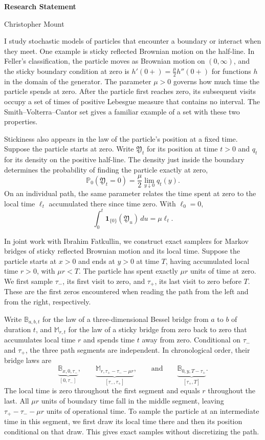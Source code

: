\documentclass[12pt,letterpaper]{article}
\begin{document}
\begin{center}
  {\Large\bfseries Research Statement}\par
  Christopher Mount
\end{center}

I study stochastic models of particles that encounter a boundary or interact when they meet.
One example is sticky reflected Brownian motion on the half-line. In Feller's classification,
the particle moves as Brownian motion on \((0,\infty)\), and the sticky boundary condition
at zero is \(h'(0+)=\tfrac{\mu}{2}h''(0+)\) for functions \(h\) in the domain of the generator.
The parameter \(\mu>0\) governs how much time the particle spends at zero. After the particle
first reaches zero, its subsequent visits occupy a set of times of positive Lebesgue measure
that contains no interval. The Smith--Volterra--Cantor set gives a familiar example of a
set with these two properties.

Stickiness also appears in the law of the particle's position at a fixed time.
Suppose the particle starts at zero. Write \(\mathfrak{Y}_t\) for its position at time
\(t>0\) and \(q_t\) for its density on the positive half-line. The density just inside the
boundary determines the probability of finding the particle exactly at zero,
\[
  \mathbb{P}_0(\mathfrak{Y}_t=0)=\frac{\mu}{2}\lim_{y\downarrow 0}q_t(y).
\]
On an individual path, the same parameter relates the time spent at zero to the
local time \(\ell_t\) accumulated there since time zero. With \(\ell_0=0\),
\[
  \int_0^t \mathbf{1}_{\{0\}}(\mathfrak{Y}_u)\,du=\mu\ell_t.
\]

In joint work with Ibrahim Fatkullin, we construct exact samplers for Markov bridges of
sticky reflected Brownian motion and its local time. Suppose the particle starts at
\(x>0\) and ends at \(y>0\) at time \(T\), having accumulated local time \(r>0\),
with \(\mu r<T\). The particle has spent exactly \(\mu r\) units of time at zero.
We first sample \(\tau_-\), its first visit to zero, and \(\tau_+\), its last visit to zero
before \(T\). These are the first zeros encountered when reading the path from the left
and from the right, respectively.

Write \(\mathbb{B}_{a,b,t}\) for the law of a three-dimensional Bessel bridge from
\(a\) to \(b\) of duration \(t\), and \(\mathbb{M}_{r,t}\) for the law of a sticky
bridge from zero back to zero that accumulates local time \(r\) and spends time \(t\)
away from zero. Conditional on \(\tau_-\) and \(\tau_+\), the three path segments
are independent. In chronological order, their bridge laws are
\[
  \underbrace{\mathbb{B}_{x,0,\tau_-}}_{[0,\tau_-]},\qquad
  \underbrace{\mathbb{M}_{r,\tau_+-\tau_- -\mu r}}_{[\tau_-,\tau_+]},\qquad
  \text{and}\qquad
  \underbrace{\mathbb{B}_{0,y,T-\tau_+}}_{[\tau_+,T]}.
\]
The local time is zero throughout the first segment and equals \(r\) throughout the last.
All \(\mu r\) units of boundary time fall in the middle segment, leaving
\(\tau_+-\tau_- -\mu r\) units of operational time. To sample the particle at an
intermediate time in this segment, we first draw its local time there and then its
position conditional on that draw. This gives exact samples without discretizing the path.
\end{document}
